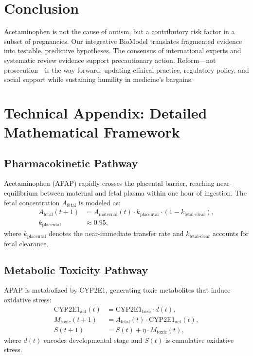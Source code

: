 \documentclass[12pt]{article}
\begin{document}
\section{Conclusion}
Acetaminophen is not the cause of autism, but a contributory risk factor in a subset of pregnancies. Our integrative BioModel translates fragmented evidence into testable, predictive hypotheses. The consensus of international experts \citep{bauer2021} and systematic review evidence \citep{navarro2025,masarwa2018} support precautionary action. Reform---not prosecution---is the way forward: updating clinical practice, regulatory policy, and social support while sustaining humility in medicine's bargains.

\appendix
\section{Technical Appendix: Detailed Mathematical Framework}

\subsection{Pharmacokinetic Pathway}
Acetaminophen (APAP) rapidly crosses the placental barrier, reaching near-equilibrium between maternal and fetal plasma within one hour of ingestion. The fetal concentration $A_{\text{fetal}}$ is modeled as:
\begin{align}
A_{\text{fetal}}(t+1) &= A_{\text{maternal}}(t) \cdot k_{\text{placental}} \cdot \left( 1 - k_{\text{fetal-clear}} \right), \\
k_{\text{placental}} &\approx 0.95,
\end{align}
where $k_{\text{placental}}$ denotes the near-immediate transfer rate and $k_{\text{fetal-clear}}$ accounts for fetal clearance.

\subsection{Metabolic Toxicity Pathway}
APAP is metabolized by CYP2E1, generating toxic metabolites that induce oxidative stress:
\begin{align}
\text{CYP2E1}_{\text{act}}(t) &= \text{CYP2E1}_{\text{base}} \cdot d(t), \\
M_{\text{toxic}}(t+1) &= A_{\text{fetal}}(t) \cdot \text{CYP2E1}_{\text{act}}(t), \\
S(t+1) &= S(t) + \eta \cdot M_{\text{toxic}}(t),
\end{align}
where $d(t)$ encodes developmental stage and $S(t)$ is cumulative oxidative stress.
\end{document}

